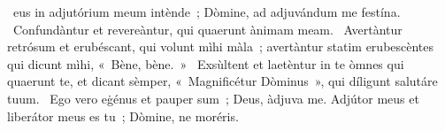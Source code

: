 \psalmChapterWithInscription{}
{ }
{%
~eus in adjutórium meum intènde~; Dòmine, ad adjuvándum me festína. 
~Confundàntur et revereàntur, qui quaerunt ànimam meam. 
~Avertàntur retrósum et erubéscant, qui volunt mìhi màla~; avertàntur statim erubescèntes qui dicunt mìhi, «~Bène, bène.~» 
~Exsùltent et laetèntur in te òmnes qui quaerunt te, et dicant sèmper, «~Magnificétur Dòminus~», qui díligunt salutáre tuum. 
~Ego vero eġénus et pauper sum~; Deus, àdjuva me. Adjútor meus et liberátor meus es tu~; Dòmine, ne moréris. 
}
